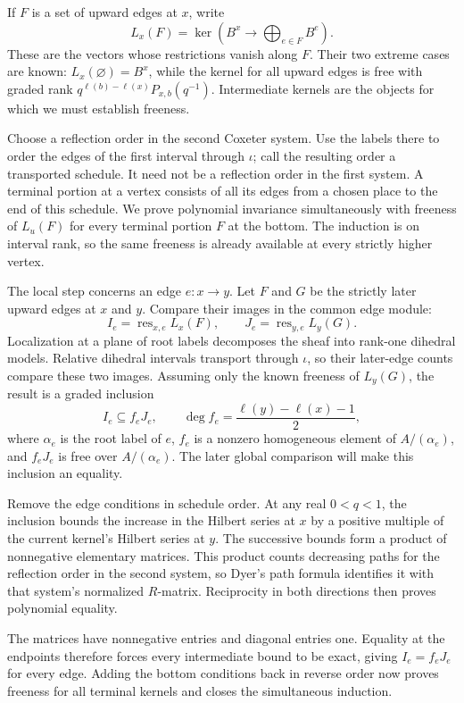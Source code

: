 If $F$ is a set of upward edges at $x$, write
\[
 L_x(F)=\ker\left(B^x\longrightarrow\bigoplus_{e\in F}B^e\right).
\]
These are the vectors whose restrictions vanish along $F$.
Their two extreme cases are known: $L_x(\varnothing)=B^x$, while the
kernel for all upward edges is free with graded rank
$q^{\ell(b)-\ell(x)}P_{x,b}(q^{-1})$.
Intermediate kernels are the objects for which we must establish
freeness.

Choose a reflection order in the second Coxeter system. Use the labels
there to order the edges of the first interval through $\iota$; call the
resulting order a transported schedule. It need not be a reflection order
in the first system. A terminal portion at a vertex consists of all its
edges from a chosen place to the end of this schedule. We prove polynomial
invariance simultaneously with freeness of $L_u(F)$ for every terminal
portion $F$ at the bottom. The induction is on interval rank, so the same
freeness is already available at every strictly higher vertex.

The local step concerns an edge $e:x\to y$. Let $F$ and $G$ be the
strictly later upward edges at $x$ and $y$. Compare their images in the
common edge module:
\[
 I_e=\operatorname{res}_{x,e}L_x(F),\qquad
 J_e=\operatorname{res}_{y,e}L_y(G).
\]
Localization at a plane of root labels decomposes the sheaf into
rank-one dihedral models. Relative dihedral intervals transport through
$\iota$, so their later-edge counts compare these two images.
Assuming only the known freeness of $L_y(G)$, the result is a graded
inclusion
\[
 I_e\subseteq f_eJ_e,\qquad
 \deg f_e=\frac{\ell(y)-\ell(x)-1}{2},
\]
where $\alpha_e$ is the root label of $e$,
$f_e$ is a nonzero homogeneous element of $A/(\alpha_e)$, and
$f_eJ_e$ is free over $A/(\alpha_e)$.
The later global comparison will make this inclusion an equality.

Remove the edge conditions in schedule order. At any real $0<q<1$, the
inclusion bounds the increase in the Hilbert series at $x$ by a positive
multiple of the current kernel's Hilbert series at $y$. The successive
bounds form a product of nonnegative elementary matrices. This product
counts decreasing paths for the reflection order in the second system,
so Dyer's path formula identifies it with that system's normalized
$R$-matrix. Reciprocity in both directions then proves polynomial
equality.

The matrices have nonnegative entries and diagonal entries one. Equality
at the endpoints therefore forces every intermediate bound to be exact,
giving $I_e=f_eJ_e$ for every edge. Adding the bottom conditions back in
reverse order now proves freeness for all terminal kernels and closes the
simultaneous induction.

